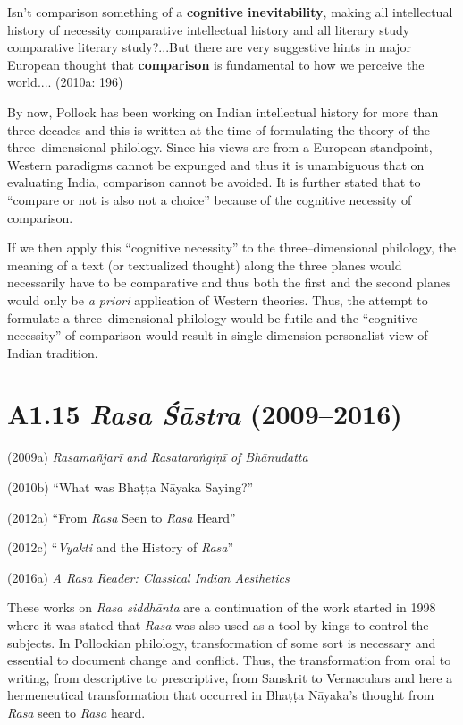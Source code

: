 \begin{myquote}
Isn’t comparison something of a \textbf{cognitive inevitability}, making all intellectual history of necessity comparative intellectual history and all literary study comparative literary study?...But there are very suggestive hints in major European thought that \textbf{comparison} is fundamental to how we perceive the world.... (2010a: 196)
\end{myquote}

By now, Pollock has been working on Indian intellectual history for more than three decades and this is written at the time of formulating the theory of the three–dimensional philology. Since his views are from a European standpoint, Western paradigms cannot be expunged and thus it is unambiguous that on evaluating India, comparison cannot be avoided. It is further stated that to “compare or not is also not a choice” because of the cognitive necessity of comparison.

If we then apply this “cognitive necessity” to the three–dimensional philology, the meaning of a text (or textualized thought) along the three planes would necessarily have to be comparative and thus both the first and the second planes would only be \textit{a priori} application of Western theories. Thus, the attempt to formulate a three–dimensional philology would be futile and the “cognitive necessity” of comparison would result in single dimension personalist view of Indian tradition.

\vspace{-.3cm}

\section*{A1.15 {\it{\textbf{Rasa Śāstra}}} (2009–2016)}

(2009a)\textit{ Rasamañjarī and Rasataraṅgiṇī of Bhānudatta }

(2010b) “What was Bhaṭṭa Nāyaka Saying?”

(2012a) “From \textit{Rasa} Seen to \textit{Rasa} Heard”

(2012c) “\textit{Vyakti }and the History of\textit{ Rasa}”

(2016a) \textit{A Rasa Reader: Classical Indian Aesthetics}

These works on \textit{Rasa siddhānta} are a continuation of the work started in 1998 where it was stated that \textit{Rasa} was also used as a tool by kings to control the subjects. In Pollockian philology, transformation of some sort is necessary and essential to document change and conflict. Thus, the transformation from oral to writing, from descriptive to prescriptive, from Sanskrit to Vernaculars and here a hermeneutical transformation that occurred in Bhaṭṭa Nāyaka’s thought from\textit{ Rasa} seen to \textit{Rasa} heard.

